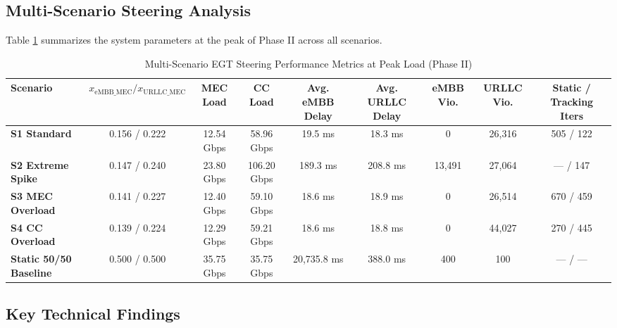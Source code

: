 \documentclass[conference]{IEEEtran}
\begin{document}
\subsection{Multi-Scenario Steering Analysis}
Table \ref{tab:results} summarizes the system parameters at the peak of Phase II across all scenarios.

\begin{table}[t]
\centering
\caption{Multi-Scenario EGT Steering Performance Metrics at Peak Load (Phase II)}
\label{tab:results}
\begin{tabular}{lcccccccc}
\hline
\textbf{Scenario} & \textbf{$x_{\text{eMBB\_MEC}} / x_{\text{URLLC\_MEC}}$} & \textbf{MEC Load} & \textbf{CC Load} & \textbf{Avg. eMBB Delay} & \textbf{Avg. URLLC Delay} & \textbf{eMBB Vio.} & \textbf{URLLC Vio.} & \textbf{Static / Tracking Iters} \\ \hline
\textbf{S1 Standard} & 0.156 / 0.222 & 12.54 Gbps & 58.96 Gbps & 19.5 ms & 18.3 ms & 0 & 26,316 & 505 / 122 \\
\textbf{S2 Extreme Spike} & 0.147 / 0.240 & 23.80 Gbps & 106.20 Gbps & 189.3 ms & 208.8 ms & 13,491 & 27,064 & --- / 147 \\
\textbf{S3 MEC Overload} & 0.141 / 0.227 & 12.40 Gbps & 59.10 Gbps & 18.6 ms & 18.9 ms & 0 & 26,514 & 670 / 459 \\
\textbf{S4 CC Overload} & 0.139 / 0.224 & 12.29 Gbps & 59.21 Gbps & 18.6 ms & 18.8 ms & 0 & 44,027 & 270 / 445 \\
\textbf{Static 50/50 Baseline} & 0.500 / 0.500 & 35.75 Gbps & 35.75 Gbps & 20,735.8 ms & 388.0 ms & 400 & 100 & --- / --- \\ \hline
\end{tabular}
\end{table}

\subsection{Key Technical Findings}
\end{document}
